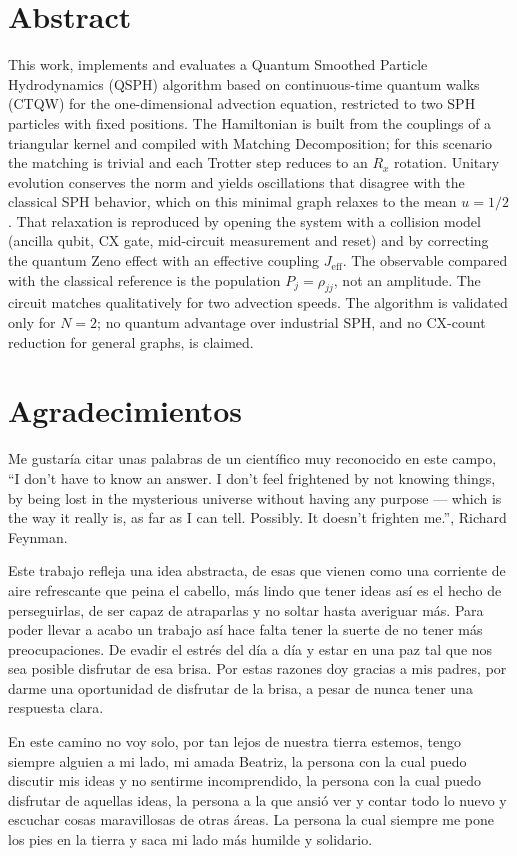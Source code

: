 \documentclass[a4paper,12pt,openany,twoside,spanish]{book}
\begin{document}
\chapter*{Abstract}
This work, implements and evaluates a Quantum Smoothed Particle Hydrodynamics (QSPH) algorithm based on continuous-time quantum walks (CTQW) for the one-dimensional advection equation, restricted to two SPH particles with fixed positions. The Hamiltonian is built from the couplings of a triangular kernel and compiled with Matching Decomposition; for this scenario the matching is trivial and each Trotter step reduces to an $R_x$ rotation. Unitary evolution conserves the norm and yields oscillations that disagree with the classical SPH behavior, which on this minimal graph relaxes to the mean $u=1/2$. That relaxation is reproduced by opening the system with a collision model (ancilla qubit, CX gate, mid-circuit measurement and reset) and by correcting the quantum Zeno effect with an effective coupling $J_{\mathrm{eff}}$. The observable compared with the classical reference is the population $P_j=\rho_{jj}$, not an amplitude. The circuit matches qualitatively for two advection speeds. The algorithm is validated only for $N=2$; no quantum advantage over industrial SPH, and no CX-count reduction for general graphs, is claimed.

\chapter*{Agradecimientos}
Me gustaría citar unas palabras de un científico muy reconocido en este campo, ``I don’t have to know an answer. I don’t feel frightened by not knowing things, by being lost in the mysterious universe without having any purpose — which is the way it really is, as far as I can tell. Possibly. It doesn’t frighten me.'', Richard Feynman. 

Este trabajo refleja una idea abstracta, de esas que vienen como una corriente de aire refrescante que peina el cabello, más lindo que tener ideas así es el hecho de perseguirlas, de ser capaz de atraparlas y no soltar hasta averiguar más. Para poder llevar a acabo un trabajo así hace falta tener la suerte de no tener más preocupaciones. De evadir el estrés del día a día y estar en una paz tal que nos sea posible disfrutar de esa brisa. Por estas razones doy gracias a mis padres, por darme una oportunidad de disfrutar de la brisa, a pesar de nunca tener una respuesta clara. 

En este camino no voy solo, por tan lejos de nuestra tierra estemos, tengo siempre alguien a mi lado, mi amada Beatriz, la persona con la cual puedo discutir mis ideas y no sentirme incomprendido, la persona con la cual puedo disfrutar de aquellas ideas, la persona a la que ansió ver y contar todo lo nuevo y escuchar cosas maravillosas de otras áreas. La persona la cual siempre me pone los pies en la tierra y saca mi lado más humilde y solidario. 
\end{document}
